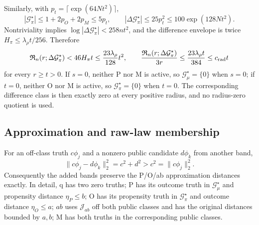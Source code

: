 Similarly, with \(p_t=\lceil\exp(64Nt^2)\rceil\),
\[
 |\mathcal G_\pi^\star|\le1+2p_O+2p_M\le5p_t,\qquad
 |\Delta\mathcal G_\pi^\star|\le25p_t^2
 \le100\exp(128Nt^2).
\]
Nontriviality implies
\(\log|\Delta\mathcal G_\pi^\star|<258nt^2\), and the difference envelope
is twice \(H_\pi\le\lambda_\rho t/256\).  Therefore
\[
 \mathfrak R_n(r;\Delta\mathcal G_\pi^\star)
 <46H_\pi t\le\frac{23\lambda_\rho}{128}t^2,
 \qquad
 \frac{\mathfrak R_n(r;\Delta\mathcal G_\pi^\star)}{3r}
 \le\frac{23\lambda_\rho t}{384}\le c_{\rm rad}t
\]
for every \(r\ge t>0\).  If \(s=0\), neither P nor M is active, so
\(\mathcal G_\mu^\star=\{0\}\) when \(s=0\); if \(t=0\), neither O nor
M is active, so \(\mathcal G_\pi^\star=\{0\}\) when \(t=0\).  The
corresponding difference class is then exactly zero at every positive
radius, and no radius-zero quotient is used.

\subsection{Approximation and raw-law membership}

For an off-class truth \(c\phi_j\) and a nonzero public candidate
\(d\phi_k\) from another band,
\[
 \|c\phi_j-d\phi_k\|_2^2=c^2+d^2>c^2
 =\|c\phi_j\|_2^2.
\]
Consequently the added bands preserve the P/O/ab approximation distances
exactly.  In detail, q has two zero truths; P has its outcome truth in
\(\mathcal G_\mu^\star\) and propensity distance \(\eta_P\le b\);
O has its propensity truth in \(\mathcal G_\pi^\star\) and outcome distance
\(\eta_O\le a\); \(ab\) uses \(\mathcal J_{ab}\) off both public classes
and has the original distances bounded by \(a,b\); M has both truths in
the corresponding public classes.

